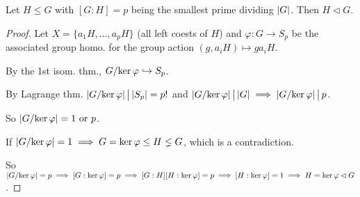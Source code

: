 \begin{prop}
  Let $H \le G$ with $[G:H] = p$ being the smallest prime dividing $\abs{G}$.
  Then $H \lhd G$.
  \begin{proof}
    Let $X = \{ a_1H, \dots, a_pH \}$ (all left coests of $H$) and
    $\varphi: G \to S_p$ be the associated group homo. for the group action
    $(g, a_iH) \mapsto ga_iH$.

    By the 1st isom. thm., $\quot{G}{\Ker\varphi} \toone S_p$.

    By Lagrange thm. $\abs*{\quot{G}{\Ker\varphi}} \Div \abs{S_p} = p!$ and
    $\abs*{\quot{G}{\Ker\varphi}} \Div \abs{G} \implies
    \abs*{\quot{G}{\Ker\varphi}} \Div p$.

    So $\abs*{\quot{G}{\Ker\varphi}} = 1 \text{~or~} p$.

    If $\abs*{\quot{G}{\Ker\varphi}} = 1 \implies G = \Ker\varphi \le H \lneq G$,
    which is a contradiction.

    So $\abs*{\quot{G}{\Ker\varphi}} = p \implies [G:\Ker\varphi] = p
    \implies [G:H][H:\Ker\varphi] = p \implies [H:\Ker\varphi] = 1
    \implies H = \Ker\varphi \lhd G$.
  \end{proof}
\end{prop}

